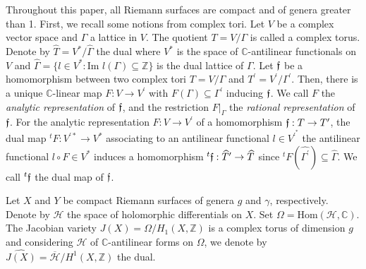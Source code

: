 \documentclass[11pt]{article}
\numberwithin{equation}{section}
\theoremstyle{plain}
\begin{document}
Throughout this paper, 
all Riemann surfaces are compact and of genera greater than 1. First, we recall some notions from complex tori.  Let $V$ be a complex vector space and $\Gamma$ a lattice in $V$. The quotient $T=V/\Gamma$ is called a complex torus.  Denote by $ \widehat{T}=V^{*}/ \widehat{\Gamma}$ the dual where $V^{*}$ is the space of $\mathbb{C}$-antilinear functionals on $V$ and $ \widehat{\Gamma}=\{l\in V^{*}:\text{Im } l(\Gamma)\subseteq\mathbb{Z}\}$ is the dual lattice of $\Gamma$. Let $\frak{f}$ be a homomorphism between two complex tori $T=V/\Gamma$ and $T^{\prime}=V^{\prime}/\Gamma^{\prime}$.  Then, there is a unique $\mathbb{C}$-linear map $F:V\rightarrow V^{\prime}$ with $F(\Gamma)\subseteq\Gamma^{\prime}$ inducing $\frak{f}$.  We call $F$ the {\it analytic representation} of $\frak{f}$, and the restriction $F|_{\Gamma}$ the {\it rational representation} of $\frak{f}$.  For the analytic representation $F:V\rightarrow V^{\prime}$ of a homomorphism $\frak{f}:T\rightarrow T^{\prime}$, the dual map $^{t}F:V^{\prime *}\to V^{*}$ associating to an antilinear functional $l\in V^{\prime^{*}}$ the antilinear functional $l\circ F\in V^{*}$ induces a homomorphism $^{t}\frak{f}: \widehat{T}^{\prime}\rightarrow \widehat{T}$ since $^{t}F( \widehat{\Gamma^{\prime}})\subseteq \widehat{\Gamma}.$ We call $^{t}\frak{f}$ the dual map of $\frak{f}$. 

 Let $X$ and $Y$ be compact Riemann surfaces of genera $g$ and $\gamma$, respectively.  Denote by $\mathcal{H}$ the space of holomorphic differentials on $X$. Set $\Omega=\text{Hom}(\mathcal{H},\mathbb{C})$.  The Jacobian variety $J(X)=\Omega/H_{1}(X,\mathbb{Z})$ is a complex torus of dimension $g$ and considering $\mathcal{H}$ of $\mathbb{C}$-antilinear forms on $\Omega$, we denote by $ \widehat{J(X)}=\overline{\mathcal{H}}/H^{1}(X,\mathbb{Z})$ the dual. 
\end{document}
